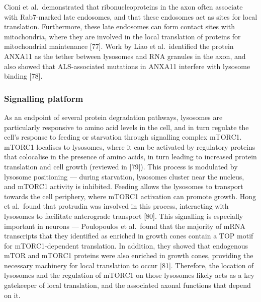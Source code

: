 \documentclass[
  12pt,
  a4paper,
]{book}
\begin{document}
Cioni et al.~demonstrated that ribonucleoproteins in the axon often associate with Rab7-marked late endosomes, and that these endosomes act as sites for local translation. Furthermore, these late endosomes can form contact sites with mitochondria, where they are involved in the local translation of proteins for mitochondrial maintenance {[}77{]}. Work by Liao et al.~identified the protein ANXA11 as the tether between lysosomes and RNA granules in the axon, and also showed that ALS-associated mutations in ANXA11 interfere with lysosome binding {[}78{]}.

\hypertarget{signalling-platform}{%
\subsubsection{Signalling platform}\label{signalling-platform}}

As an endpoint of several protein degradation pathways, lysosomes are particularly responsive to amino acid levels in the cell, and in turn regulate the cell's response to feeding or starvation through signalling complex mTORC1. mTORC1 localises to lysosomes, where it can be activated by regulatory proteins that colocalise in the presence of amino acids, in turn leading to increased protein translation and cell growth (reviewed in {[}79{]}). This process is modulated by lysosome positioning --- during starvation, lysosomes cluster near the nucleus, and mTORC1 activity is inhibited. Feeding allows the lysosomes to transport towards the cell periphery, where mTORC1 activation can promote growth. Hong et al.~found that protrudin was involved in this process, interacting with lysosomes to facilitate anterograde transport {[}80{]}. This signalling is especially important in neurons --- Poulopoulos et al.~found that the majority of mRNA transcripts that they identified as enriched in growth cones contain a TOP motif for mTORC1-dependent translation. In addition, they showed that endogenous mTOR and mTORC1 proteins were also enriched in growth cones, providing the necessary machinery for local translation to occur {[}81{]}. Therefore, the location of lysosomes and the regulation of mTORC1 on those lysosomes likely acts as a key gatekeeper of local translation, and the associated axonal functions that depend on it.
\end{document}
